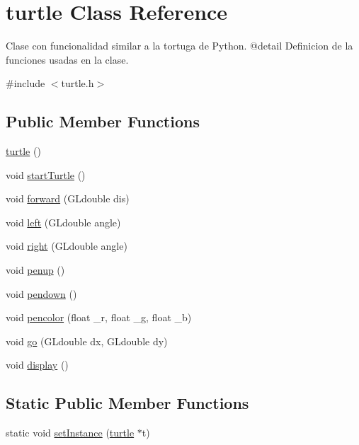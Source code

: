 \hypertarget{classturtle}{}\section{turtle Class Reference}
\label{classturtle}


Clase con funcionalidad similar a la tortuga de Python. @detail Definicion de la funciones usadas en la clase.  




{\ttfamily \#include $<$turtle.\+h$>$}

\subsection*{Public Member Functions}
\begin{DoxyCompactItemize}
\item 
\mbox{\hyperlink{classturtle_a38abda65e64c33bd48bdd6662bef1bf2}{turtle}} ()
\item 
void \mbox{\hyperlink{classturtle_a143af204e99516b62c98819342d1926c}{start\+Turtle}} ()
\item 
void \mbox{\hyperlink{classturtle_ad00882aa7ab7d41770d50e9112138fe1}{forward}} (G\+Ldouble dis)
\item 
void \mbox{\hyperlink{classturtle_a52c30b7ecd387a2a4f7c7f5e5ae3cf53}{left}} (G\+Ldouble angle)
\item 
void \mbox{\hyperlink{classturtle_a00c343717c40ee2540260b77f7ca605f}{right}} (G\+Ldouble angle)
\item 
void \mbox{\hyperlink{classturtle_afe37f1aeba6de628a66e65e10e6d4b9d}{penup}} ()
\item 
void \mbox{\hyperlink{classturtle_a69c2ddc590397f4eab48f99a95f1647b}{pendown}} ()
\item 
void \mbox{\hyperlink{classturtle_a8f4ba1bb435b5a8a25fd381cd10120ff}{pencolor}} (float \+\_\+r, float \+\_\+g, float \+\_\+b)
\item 
void \mbox{\hyperlink{classturtle_a8ff5abdc6c30e0d2781029c304ccc6d9}{go}} (G\+Ldouble dx, G\+Ldouble dy)
\item 
void \mbox{\hyperlink{classturtle_a43c0e14ffac82be79c6f10532765f13c}{display}} ()
\end{DoxyCompactItemize}
\subsection*{Static Public Member Functions}
\begin{DoxyCompactItemize}
\item 
static void \mbox{\hyperlink{classturtle_a1598c2ba3f8645f8312695793e4c9cbd}{set\+Instance}} (\mbox{\hyperlink{classturtle}{turtle}} $\ast$t)
\end{DoxyCompactItemize}


